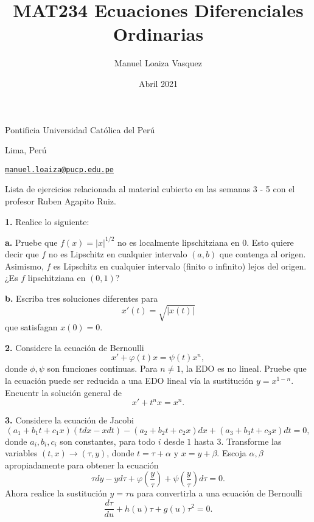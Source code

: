 \documentclass{article}
\title{MAT234 Ecuaciones Diferenciales Ordinarias}
\author{Manuel Loaiza Vasquez}
\date{Abril 2021}
\newenvironment{statement}[1]{\smallskip\noindent\color[rgb]{1.00,0.00,0.50} {\bf #1.}}{}
\theoremstyle{definition}
\theoremstyle{remark}
\begin{document}
\maketitle

\vspace*{-0.25in}
\centerline{Pontificia Universidad Cat\'olica del Per\'u}
\centerline{Lima, Per\'u}
\centerline{\href{mailto:manuel.loaiza@pucp.edu.pe}{{\tt manuel.loaiza@pucp.edu.pe}}}
\vspace*{0.15in}

\begin{framed}
  Lista de ejercicios relacionada al material cubierto en las semanas 3 - 5 con
  el profesor Ruben Agapito Ruiz.
\end{framed}

\begin{statement}{1}
  Realice lo siguiente:
\end{statement}

\begin{statement}{a}
  Pruebe que $f(x) = |x|^{1 / 2}$ no es localmente lipschitziana en $0$.
  Esto quiere decir que $f$ no es Lipschitz en cualquier intervalo $(a, b)$ que
  contenga al origen.
  Asimismo, $f$ es Lipschitz en cualquier intervalo (finito o infinito) lejos
  del origen.
  ¿Es $f$ lipschitziana en $(0, 1)$?
\end{statement}

\begin{statement}{b}
  Escriba tres soluciones diferentes para
  \[
    x'(t) = \sqrt{|x(t)|}
  \]
  que satisfagan $x(0) = 0$.
\end{statement}

\begin{statement}{2}
  Considere la ecuaci\'on de Bernoulli
  \[
    x' + \varphi(t) x = \psi(t) x^n,
  \]
  donde $\phi, \psi$ son funciones continuas.
  Para $n \neq 1$, la EDO es no lineal.
  Pruebe que la ecuaci\'on puede ser reducida a una EDO lineal v\'ia la
  sustituci\'on $y = x^{1 - n}$. Encuentr la soluci\'on general de
  \[
    x' + t^n x = x^n.  
  \]
\end{statement}

\begin{statement}{3}
  Considere la ecuaci\'on de Jacobi
  \[
    (a_1 + b_1 t + c_1 x) (t dx - x dt) - (a_2 + b_2 t + c_2 x) dx + (a_3 + b_3 t + c_3 x) dt = 0,  
  \]
  donde $a_i, b_i, c_i$ son constantes, para todo $i$ desde $1$ hasta $3$.
  Transforme las variables $(t, x) \to (\tau, y)$, donde
  $t = \tau + \alpha$ y $x = y + \beta$.
  Escoja $\alpha, \beta$ apropiadamente para obtener la ecuaci\'on
  \[
    \tau dy - y d \tau   + \varphi\left(\frac{y}{\tau}\right) +
    \psi\left(\frac{y}{\tau}\right) d\tau = 0.
  \]
  Ahora realice la sustituci\'on $y = \tau u$ para convertirla a una ecuaci\'on
  de Bernoulli
  \[
    \frac{d \tau}{du} + h(u) \tau + g(u) \tau^2 = 0.
  \]
\end{statement}
\end{document}

